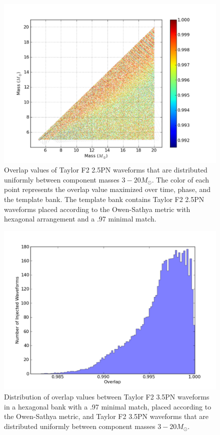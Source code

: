 \documentclass[aps,
prd,
amsmath,
amssymb,
twocolumn,
floatfix,
groupedaddress]{revtex4-1}
\begin{document}
\begin{figure}[h]
\includegraphics[scale=0.04, clip=false, totalheight=0.3\textheight]{taylorf2-2pn-bank.pdf}
\caption{\label{fig:taylorf2-25PN-bank} Overlap values of Taylor F2 2.5PN waveforms that are distributed 
uniformly between component masses $3 -20 M_{\odot}$. The color of each point represents the overlap value 
maximized over time, phase, and the template bank. The template bank contains Taylor F2 2.5PN waveforms placed 
according to the Owen-Sathya metric with hexagonal arrangement and a .97 minimal match.}
\end{figure}

\begin{figure}
\includegraphics[scale=0.04, clip=false, totalheight=0.3\textheight]{taylorf2-35pn-hist.pdf}
\caption{\label{fig:taylorf2-35PN-hist}Distribution of overlap values between Taylor F2 3.5PN waveforms
in a hexagonal bank with a .97 minimal match, placed according to the Owen-Sathya metric, and Taylor F2 3.5PN
 waveforms that are distributed uniformly between component masses $3 -20 M_{\odot}$.}
\end{figure}
\end{document}
